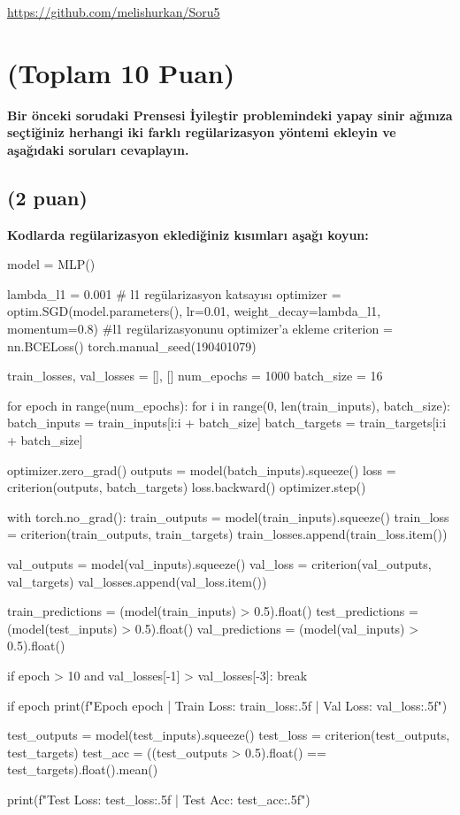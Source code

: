 \documentclass[11pt]{article}
\begin{document}
\url{https://github.com/melishurkan/Soru5}

\section{(Toplam 10 Puan)} \textbf{Bir önceki sorudaki Prensesi İyileştir problemindeki yapay sinir ağınıza seçtiğiniz herhangi iki farklı regülarizasyon yöntemi ekleyin ve aşağıdaki soruları cevaplayın.} 

\subsection{(2 puan)} \textbf{Kodlarda regülarizasyon eklediğiniz kısımları aşağı koyun:} 

\begin{python}
model = MLP()

lambda_l1 = 0.001  # l1 regülarizasyon katsayısı
optimizer = optim.SGD(model.parameters(), lr=0.01, weight_decay=lambda_l1, momentum=0.8) #l1 regülarizasyonunu optimizer'a ekleme
criterion = nn.BCELoss()
torch.manual_seed(190401079)


train_losses, val_losses = [], []
num_epochs = 1000
batch_size = 16

for epoch in range(num_epochs):
    for i in range(0, len(train_inputs), batch_size):
        batch_inputs = train_inputs[i:i + batch_size]
        batch_targets = train_targets[i:i + batch_size]

        optimizer.zero_grad()
        outputs = model(batch_inputs).squeeze()
        loss = criterion(outputs, batch_targets)
        loss.backward()
        optimizer.step()

    with torch.no_grad():
        train_outputs = model(train_inputs).squeeze()
        train_loss = criterion(train_outputs, train_targets)
        train_losses.append(train_loss.item())

        val_outputs = model(val_inputs).squeeze()
        val_loss = criterion(val_outputs, val_targets)
        val_losses.append(val_loss.item())

        train_predictions = (model(train_inputs) > 0.5).float()
        test_predictions = (model(test_inputs) > 0.5).float()
        val_predictions = (model(val_inputs) > 0.5).float()

    if epoch > 10 and val_losses[-1] > val_losses[-3]:
        break

    if epoch %
        print(f"Epoch {epoch} | Train Loss: {train_loss:.5f} | Val Loss: {val_loss:.5f}")

test_outputs = model(test_inputs).squeeze()
test_loss = criterion(test_outputs, test_targets)
test_acc = ((test_outputs > 0.5).float() == test_targets).float().mean()

print(f"Test Loss: {test_loss:.5f} | Test Acc: {test_acc:.5f}")
\end{python}
\end{document}
